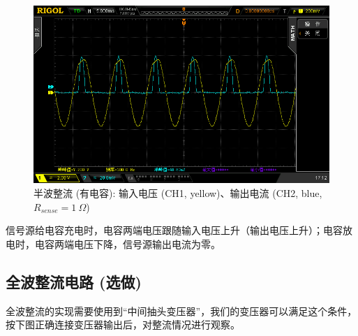 \documentclass[UTF8]{article}
\begin{document}
\begin{figure}[H]\centering
    \includegraphics[width=\columnwidth]{LCE-01-二极管/assets/二极管整流电路/半波整流-接电容-电流波形 单二极管 有电容 输出接电阻.png}
    \caption{半波整流 (有电容): 输入电压 (CH1, yellow)、输出电流 (CH2, blue, $R_{sense} = 1\ \Omega$)}
\end{figure}

信号源给电容充电时，电容两端电压跟随输入电压上升（输出电压上升）；电容放电时，电容两端电压下降，信号源输出电流为零。

\subsection{全波整流电路 (选做)}

全波整流的实现需要使用到“中间抽头变压器”，我们的变压器可以满足这个条件，按下图正确连接变压器输出后，对整流情况进行观察。
\end{document}
